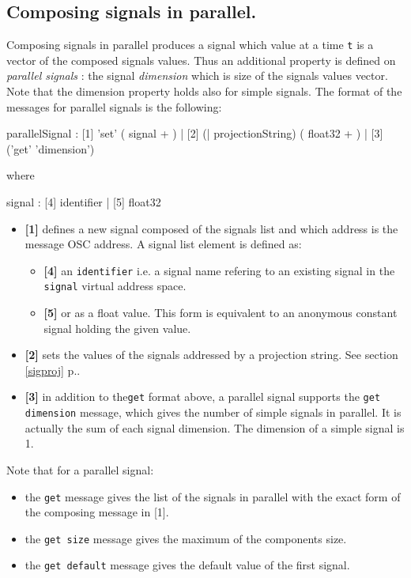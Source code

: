 \documentclass[a4paper,twoside]{report}
\newcommand{\subsublevel}[1]	{\subsection{#1}}
\newcommand{\fullref}[1]	{\ref{#1} p.\pageref{#1}}
\newcommand{\OSC}[1]		{\texttt{#1}}
\newcommand{\values}[1]	{\texttt{#1}}
\begin{document}
\subsublevel{Composing signals in parallel.}
Composing signals in parallel produces a signal which value at a time \values{t} is a vector of the composed signals values. Thus an additional property is defined on \emph{parallel signals} : the signal \emph{dimension} which is size of the signals values vector. Note that the dimension property holds also for simple signals.
The format of the messages for parallel signals is the following:
\begin{rail}
parallelSignal :  
		  [1] 'set' ( signal + )
		| [2] (| projectionString) ( float32 + )
		| [3] ('get' 'dimension') 
\end{rail}
where 
\begin{rail}
signal :  
		  [4] identifier
		| [5] float32
\end{rail}

\begin{itemize}
\item \textbf{[1]} defines a new signal composed of the signals list and which address is the message OSC address. A signal list element is defined as:

\begin{itemize}
\item \textbf{[4]} an \OSC{identifier} i.e. a signal name refering to an existing signal in the \OSC{signal} virtual address space. 
\item \textbf{[5]} or as a float value. This form is equivalent to an anonymous constant signal holding the given value. 
\end{itemize}

\item \textbf{[2]} sets the values of the signals addressed by a projection string. See section \fullref{sigproj}. 
\item \textbf{[3]} in addition to the\OSC{get} format above, a parallel signal supports the \OSC{get dimension} message, which gives the number of simple signals in parallel. It is actually the sum of each signal dimension. The dimension of a simple signal is 1. 
\end{itemize}

Note that for a parallel signal:
\begin{itemize}
\item the \OSC{get} message gives the list of the signals in parallel with the exact form of the composing message in [1]. 
\item the \OSC{get size} message gives the maximum of the components size. 
\item the \OSC{get default} message gives the default value of the first signal. 
\end{itemize}
\end{document}

